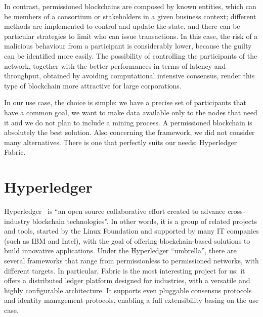 In contrast, permissioned blockchains are composed by known entities, which can be members of a consortium or stakeholders in a given business context; different methods are implemented to control and update the state, and there can be particular strategies to limit who can issue transactions. In this case, the risk of a malicious behaviour from a participant is considerably lower, because the guilty can be identified more easily. The possibility of controlling the participants of the network, together with the better performances in terms of latency and throughput, obtained by avoiding computational intensive consensus, render this type of blockchain more attractive for large corporations.

In our use case, the choice is simple: we have a precise set of participants that have a common goal, we want to make data available only to the nodes that need it and we do not plan to include a mining process. A permissioned blockchain is absolutely the best solution. Also concerning the framework, we did not consider many alternatives. There is one that perfectly suits our needs: Hyperledger Fabric. 

\section{Hyperledger}
\label{sec:hyperledger}
Hyperledger~\cite{hyperledger} is ``an open source collaborative effort created to advance cross-industry blockchain technologies''. In other words, it is a group of related projects and tools, started by the Linux Foundation and supported by many IT companies (such as IBM and Intel), with the goal of offering blockchain-based solutions to build innovative applications. Under the Hyperledger ``umbrella'', there are several frameworks that range from permissionless to permissioned networks, with different targets. In particular, Fabric is the most interesting project for us: it offers a distributed ledger platform designed for industries, with a versatile and highly configurable architecture. It supports even pluggable consensus protocols and identity management protocols, enabling a full extensibility basing on the use case.

